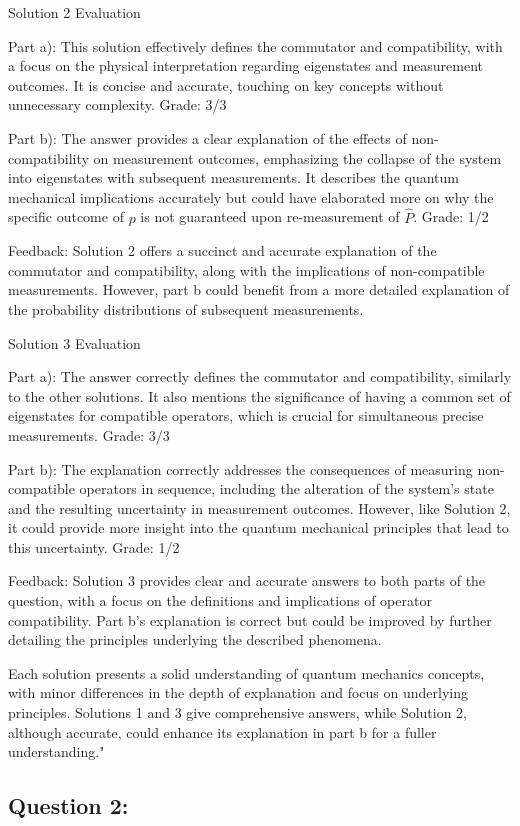 \documentclass[a4paper,11pt]{article}
\begin{document}
Solution 2 Evaluation

Part a): This solution effectively defines the commutator and compatibility, with a focus on the physical interpretation regarding eigenstates and measurement outcomes. It is concise and accurate, touching on key concepts without unnecessary complexity. Grade: 3/3

Part b): The answer provides a clear explanation of the effects of non-compatibility on measurement outcomes, emphasizing the collapse of the system into eigenstates with subsequent measurements. It describes the quantum mechanical implications accurately but could have elaborated more on why the specific outcome of \(p\) is not guaranteed upon re-measurement of \( \hat{P} \). Grade: 1/2

Feedback: Solution 2 offers a succinct and accurate explanation of the commutator and compatibility, along with the implications of non-compatible measurements. However, part b could benefit from a more detailed explanation of the probability distributions of subsequent measurements.

Solution 3 Evaluation

Part a): The answer correctly defines the commutator and compatibility, similarly to the other solutions. It also mentions the significance of having a common set of eigenstates for compatible operators, which is crucial for simultaneous precise measurements. Grade: 3/3

Part b): The explanation correctly addresses the consequences of measuring non-compatible operators in sequence, including the alteration of the system's state and the resulting uncertainty in measurement outcomes. However, like Solution 2, it could provide more insight into the quantum mechanical principles that lead to this uncertainty. Grade: 1/2

Feedback: Solution 3 provides clear and accurate answers to both parts of the question, with a focus on the definitions and implications of operator compatibility. Part b's explanation is correct but could be improved by further detailing the principles underlying the described phenomena.

Each solution presents a solid understanding of quantum mechanics concepts, with minor differences in the depth of explanation and focus on underlying principles. Solutions 1 and 3 give comprehensive answers, while Solution 2, although accurate, could enhance its explanation in part b for a fuller understanding."


\subsection*{Question 2:}
\end{document}
